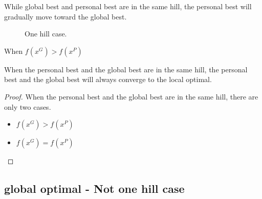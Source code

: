 While global best and personal best are in the same hill, the personal best will gradually move toward the global best.

\begin{figure}
\centering
{}
\caption{One hill case.}
\label{fig:one_hill_case}
\end{figure}

\begin{lemma}
When $ f(x^{G}) > f(x^{P}) $ 
\end{lemma}

\begin{theorem}
When the personal best and the global best are in the same hill, the personal best and the global best will always converge to the local optimal.
\begin{proof}
When the personal best and the global best are in the same hill, there are only two cases.
\begin{itemize}
\item $ f(x^{G}) > f(x^{P}) $ 
\item $ f(x^{G}) = f(x^{P}) $ 
\end{itemize}
\end{proof}
\end{theorem}


\subsection{global optimal - Not one hill case}

